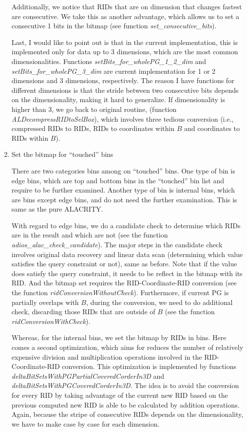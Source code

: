 \documentclass[11pt,a4paper]{article}
\newcommand{\alac}{ALACRITY}
\begin{document}
\begin{enumerate}
Additionally, we notice that RIDs that are on dimension that changes fastest are consecutive. 
We take this as another advantage, which allows us to set a consecutive 1 bits in the bitmap (see function \emph{set\_consecutive\_bits}). 

Last, I would like to point out is that in the current implementation, this is implemented only for data up to 3 dimensions, which are the most common dimensionalities.
Functions \emph{setBits\_for\_wholePG\_1\_2\_dim} and \emph{setBits\_for\_wholePG\_3\_dim} are current implementation for 1 or 2 dimensions and 3 dimensions, respectively. 
The reason I have functions for different dimensions is that the stride between two consecutive bits depends on the dimensionality, making it hard to generalize. 
If dimensionality is higher than 3, we go back to original routine, (function \emph{ALDecompressRIDtoSelBox}), which involves three tedious conversion (i.e., compressed RIDs to RIDs, RIDs to coordinates within $B$ and coordinates to RIDs within $B$).


\item Set the bitmap for ``touched'' bins

There are two categories bins among on ``touched'' bins. 
One type of bin is edge bins, which are top and bottom bins in the ``touched'' bin list and require to be further examined. 
Another type of bin is internal bins, which are bins except edge bins, and do not need the further examination. 
This is same as the pure \alac. 

With regard to edge bins, we do a candidate check to determine which RIDs are in the result and which are not (see the function \emph{adios\_alac\_check\_candidate}). 
The major steps in the candidate check involves original data recovery and linear data scan (determining which value satisfies the query constraint or not), same as before. 
Note that if the value does satisfy the query constraint, it needs to be reflect in the bitmap with its RID. 
And the bitmap set requires the RID-Coordinate-RID conversion (see the function \emph{ridConversionWithoutCheck}). 
Furthermore, if current PG is partially overlaps with $B$, during the conversion, we need to do additional check, discarding those RIDs that are outside of $B$ (see the function \emph{ridConversionWithCheck}).

Whereas, for the internal bins, we set the bitmap by RIDs in bins. Here comes a second optimization, which aims for reduces the number of relatively expensive division and multiplication operations involved in the RID-Coordinate-RID conversion. 
This optimization is implemented by functions \emph{deltaBitSetsWithPGPartialCoveredCorderIn3D} and \emph{deltaBitSetsWithPGCoveredCorderIn3D}. 
The idea is to avoid the conversion for every RID by taking advantage of the current new RID based on the previous computed new RID is able to be calculated by addition operations.
Again, because the stripe of consecutive RIDs depends on the dimensionality, we have to make case by case for each dimension. 
\end{enumerate}
\end{document}

